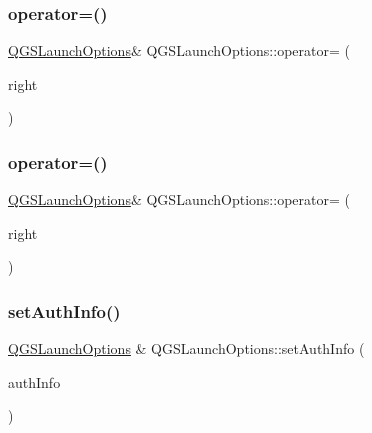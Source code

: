 \subsubsection{\texorpdfstring{operator=()}{operator=()}\hspace{0.1cm}{\footnotesize\ttfamily [1/2]}}
{\footnotesize\ttfamily \mbox{\hyperlink{class_q_g_s_launch_options}{Q\+G\+S\+Launch\+Options}}\& Q\+G\+S\+Launch\+Options\+::operator= (\begin{DoxyParamCaption}\item[{const \mbox{\hyperlink{class_q_g_s_launch_options}{Q\+G\+S\+Launch\+Options}} \&}]{right }\end{DoxyParamCaption})\hspace{0.3cm}{\ttfamily [default]}}

\mbox{\label{class_q_g_s_launch_options_afa748cac522ab7f2a3921f5392bd8ee0}} 
\subsubsection{\texorpdfstring{operator=()}{operator=()}\hspace{0.1cm}{\footnotesize\ttfamily [2/2]}}
{\footnotesize\ttfamily \mbox{\hyperlink{class_q_g_s_launch_options}{Q\+G\+S\+Launch\+Options}}\& Q\+G\+S\+Launch\+Options\+::operator= (\begin{DoxyParamCaption}\item[{\mbox{\hyperlink{class_q_g_s_launch_options}{Q\+G\+S\+Launch\+Options}} \&\&}]{right }\end{DoxyParamCaption})\hspace{0.3cm}{\ttfamily [default]}}

\mbox{\label{class_q_g_s_launch_options_a6b10f450522defde64ba05fb69107620}} 
\subsubsection{\texorpdfstring{set\+Auth\+Info()}{setAuthInfo()}}
{\footnotesize\ttfamily \mbox{\hyperlink{class_q_g_s_launch_options}{Q\+G\+S\+Launch\+Options}} \& Q\+G\+S\+Launch\+Options\+::set\+Auth\+Info (\begin{DoxyParamCaption}\item[{const \mbox{\hyperlink{class_q_g_s_auth_info}{Q\+G\+S\+Auth\+Info}} \&}]{auth\+Info }\end{DoxyParamCaption})}

